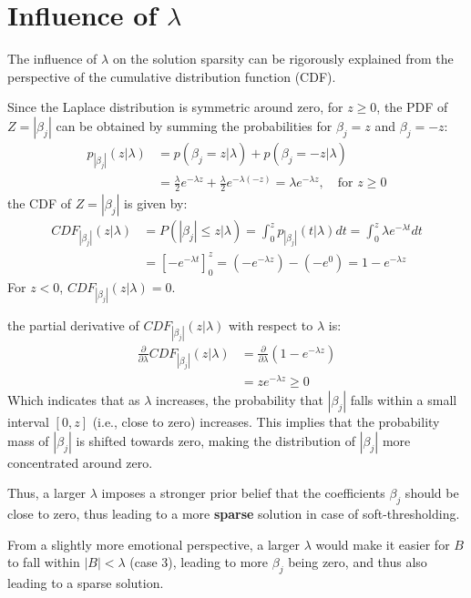 \documentclass[11pt, a4paper, oneside]{memoir}
\begin{document}
\section[Influence of lambda]{Influence of $\lambda$}
The influence of $\lambda$ on the solution sparsity can be rigorously explained from the perspective of the cumulative distribution function (CDF).

Since the Laplace distribution is symmetric around zero,
for $z \geq 0$, the PDF of $Z = |\beta_j|$ can be obtained by summing the probabilities for $\beta_j = z$ and $\beta_j = -z$:
\begin{align*}
  p_{|\beta_j|}(z | \lambda) &= p(\beta_j = z | \lambda) + p(\beta_j = -z | \lambda) \\
  &= \frac{\lambda}{2} e^{-\lambda z} + \frac{\lambda}{2} e^{-\lambda (-z)} = \lambda e^{-\lambda z}, \quad \text{for } z \geq 0
\end{align*}
the CDF of $Z = |\beta_j|$ is given by:
\begin{align*}
  CDF_{|\beta_j|}(z | \lambda) &= P(|\beta_j| \leq z | \lambda) = \int_0^z p_{|\beta_j|}(t | \lambda) dt = \int_0^z \lambda e^{-\lambda t} dt \\
  &= \left[ -e^{-\lambda t} \right]_0^z = (-e^{-\lambda z}) - (-e^0) = 1 - e^{-\lambda z}
\end{align*}
For $z < 0$, $CDF_{|\beta_j|}(z | \lambda) = 0$.

the partial derivative of $CDF_{|\beta_j|}(z | \lambda)$ with respect to $\lambda$ is:
\begin{align*}
  \frac{\partial}{\partial \lambda} CDF_{|\beta_j|}(z | \lambda) &= \frac{\partial}{\partial \lambda} (1 - e^{-\lambda z}) \\
  &= z e^{-\lambda z} \geq 0
\end{align*}
Which indicates that as $\lambda$ increases, the probability that $|\beta_j|$ falls within a small interval $[0, z]$ (i.e., close to zero) increases.
This implies that the probability mass of $|\beta_j|$ is shifted towards zero, making the distribution of $|\beta_j|$ more concentrated around zero.

Thus, a larger $\lambda$ imposes a stronger prior belief that the coefficients $\beta_j$ should be close to zero,
thus leading to a more \textbf{sparse} solution in case of soft-thresholding.

From a slightly more emotional perspective, a larger $\lambda$ would make it easier for $B$ to fall within $|B|<\lambda$ (case 3),
leading to more $\beta_j$ being zero, and thus also leading to a sparse solution.
\end{document}
